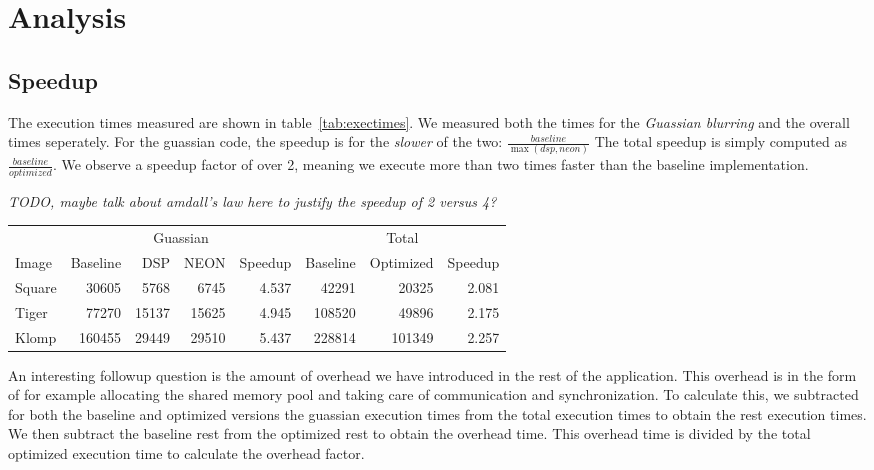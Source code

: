 \section{Analysis}
\subsection{Speedup}
The execution times measured are shown in table~\ref{tab:exectimes}. We measured both the times for the \emph{Guassian blurring} and the overall times seperately. For the guassian code, the speedup is for the \emph{slower} of the two: $\frac{baseline}{\max(dsp,neon)}$ The total speedup is simply computed as $\frac{baseline}{optimized}$. We observe a speedup factor of over 2, meaning we execute more than two times faster than the baseline implementation.

\emph{TODO, maybe talk about amdall's law here to justify the speedup of 2 versus 4?}

\begin{figure*}
\centering
\begin{tabular}{l | r r r r | r r r}
        & \multicolumn{4}{|c|}{Guassian}                & \multicolumn{3}{|c}{Total}                \\
Image   & Baseline  & DSP   & NEON          & Speedup   & Baseline  & Optimized         & Speedup   \\
\hline
Square  & 30605     & 5768  & 6745          & 4.537     & 42291     & 20325             & 2.081     \\
Tiger   & 77270     & 15137 & 15625         & 4.945     & 108520    & 49896             & 2.175     \\
Klomp   & 160455    & 29449 & 29510         & 5.437     & 228814    & 101349            & 2.257     \\
\end{tabular}
\caption{The execution times measured in us}
\label{tab:exectimes}
\end{figure*}


An interesting followup question is the amount of overhead we have introduced in the rest of the application. This overhead is in the form of for example allocating the shared memory pool and taking care of communication and synchronization. To calculate this, we subtracted for both the baseline and optimized versions the guassian execution times from the total execution times to obtain the rest execution times. We then subtract the baseline rest from the optimized rest to obtain the overhead time. This overhead time is divided by the total optimized execution time to calculate the overhead factor.

